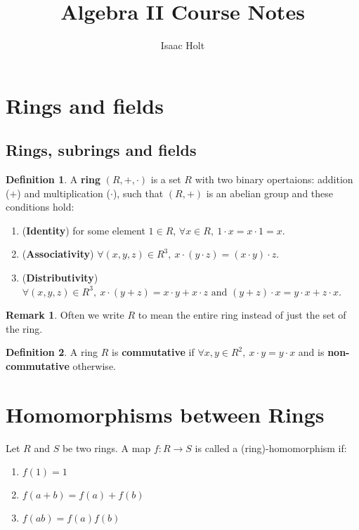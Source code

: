 \documentclass[12pt,a4paper]{article}
\title{Algebra II Course Notes}
\author{Isaac Holt}
\theoremstyle{definition}
\newtheorem{definition}{Definition}[subsection]
\newtheorem*{remark}{Remark}
\begin{document}
\maketitle

\section{Rings and fields}

\subsection{Rings, subrings and fields}

\begin{definition}
	A \textbf{ring} $(R, +, \cdot)$ is a set $R$ with two binary opertaions: addition ($+$) and multiplication ($\cdot$), such that $(R, +)$ is an abelian group and these conditions hold:
	\begin{enumerate}
		\item (\textbf{Identity}) for some element $1 \in R$, $\forall x \in R, \ 1 \cdot x = x \cdot 1 = x$.
		\item (\textbf{Associativity}) $\forall (x, y, z) \in R^3, \ x \cdot (y \cdot z) = (x \cdot y) \cdot z$.
		\item (\textbf{Distributivity}) $\forall (x, y, z) \in R^3, \ x \cdot (y + z) = x \cdot y + x \cdot z \text{ and } (y + z) \cdot x = y \cdot x + z \cdot x$. 
	\end{enumerate}
\end{definition}

\begin{remark}
	Often we write $R$ to mean the entire ring instead of just the set of the ring.
\end{remark}

\begin{definition}
	A ring $R$ is \textbf{commutative} if $\forall x, y \in R^2, \ x \cdot y = y \cdot x$ and is \textbf{non-commutative} otherwise.
\end{definition}

\section{Homomorphisms between Rings}

Let $R$ and $S$ be two rings. A map $f: R \rightarrow S$ is called a (ring)-homomorphism if:
\begin{enumerate}
	\item $f(1) = 1$
	\item $f(a + b) = f(a) + f(b)$
	\item $f(ab) = f(a)f(b)$
\end{enumerate}
\end{document}
